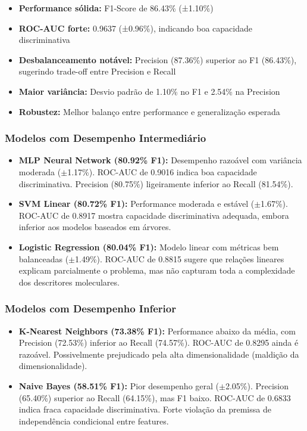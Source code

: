 \documentclass[12pt,a4paper]{article}
\begin{document}
\begin{itemize}
    \item \textbf{Performance sólida:} F1-Score de 86.43\% (±1.10\%)
    \item \textbf{ROC-AUC forte:} 0.9637 (±0.96\%), indicando boa capacidade discriminativa
    \item \textbf{Desbalanceamento notável:} Precision (87.36\%) superior ao F1 (86.43\%), sugerindo trade-off entre Precision e Recall
    \item \textbf{Maior variância:} Desvio padrão de 1.10\% no F1 e 2.54\% na Precision
    \item \textbf{Robustez:} Melhor balanço entre performance e generalização esperada
\end{itemize}

\subsubsection{Modelos com Desempenho Intermediário}

\begin{itemize}
    \item \textbf{MLP Neural Network (80.92\% F1):} Desempenho razoável com variância moderada ($\pm$1.17\%). ROC-AUC de 0.9016 indica boa capacidade discriminativa. Precision (80.75\%) ligeiramente inferior ao Recall (81.54\%).
    
    \item \textbf{SVM Linear (80.72\% F1):} Performance moderada e estável ($\pm$1.67\%). ROC-AUC de 0.8917 mostra capacidade discriminativa adequada, embora inferior aos modelos baseados em árvores.
    
    \item \textbf{Logistic Regression (80.04\% F1):} Modelo linear com métricas bem balanceadas ($\pm$1.49\%). ROC-AUC de 0.8815 sugere que relações lineares explicam parcialmente o problema, mas não capturam toda a complexidade dos descritores moleculares.
\end{itemize}

\subsubsection{Modelos com Desempenho Inferior}

\begin{itemize}
    \item \textbf{K-Nearest Neighbors (73.38\% F1):} Performance abaixo da média, com Precision (72.53\%) inferior ao Recall (74.57\%). ROC-AUC de 0.8295 ainda é razoável. Possivelmente prejudicado pela alta dimensionalidade (maldição da dimensionalidade).
    
    \item \textbf{Naive Bayes (58.51\% F1):} Pior desempenho geral ($\pm$2.05\%). Precision (65.40\%) superior ao Recall (64.15\%), mas F1 baixo. ROC-AUC de 0.6833 indica fraca capacidade discriminativa. Forte violação da premissa de independência condicional entre features.
\end{itemize}
\end{document}
